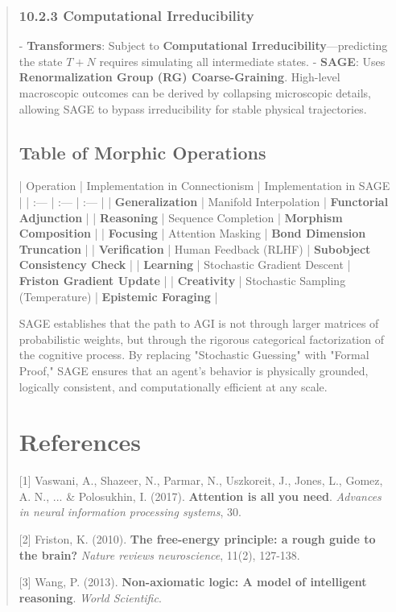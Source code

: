 \documentclass[10pt,twocolumn,letterpaper]{article}
\begin{document}
\begin{abstract}
\subsubsection{10.2.3 Computational Irreducibility}
- \textbf{Transformers}: Subject to \textbf{Computational Irreducibility}—predicting the state $T+N$ requires simulating all intermediate states.
- \textbf{SAGE}: Uses \textbf{Renormalization Group (RG) Coarse-Graining}. High-level macroscopic outcomes can be derived by collapsing microscopic details, allowing SAGE to bypass irreducibility for stable physical trajectories.

\subsection{Table of Morphic Operations}

| Operation | Implementation in Connectionism | Implementation in SAGE |
| :--- | :--- | :--- |
| \textbf{Generalization} | Manifold Interpolation | \textbf{Functorial Adjunction} |
| \textbf{Reasoning} | Sequence Completion | \textbf{Morphism Composition} |
| \textbf{Focusing} | Attention Masking | \textbf{Bond Dimension Truncation} |
| \textbf{Verification} | Human Feedback (RLHF) | \textbf{Subobject Consistency Check} |
| \textbf{Learning} | Stochastic Gradient Descent | \textbf{Friston Gradient Update} |
| \textbf{Creativity} | Stochastic Sampling (Temperature) | \textbf{Epistemic Foraging} |

SAGE establishes that the path to AGI is not through larger matrices of probabilistic weights, but through the rigorous categorical factorization of the cognitive process. By replacing "Stochastic Guessing" with "Formal Proof," SAGE ensures that an agent’s behavior is physically grounded, logically consistent, and computationally efficient at any scale.


\section{References}

[1] Vaswani, A., Shazeer, N., Parmar, N., Uszkoreit, J., Jones, L., Gomez, A. N., ... & Polosukhin, I. (2017). \textbf{Attention is all you need}. \textit{Advances in neural information processing systems}, 30.

[2] Friston, K. (2010). \textbf{The free-energy principle: a rough guide to the brain?} \textit{Nature reviews neuroscience}, 11(2), 127-138.

[3] Wang, P. (2013). \textbf{Non-axiomatic logic: A model of intelligent reasoning}. \textit{World Scientific}.


\end{abstract}
\end{document}

